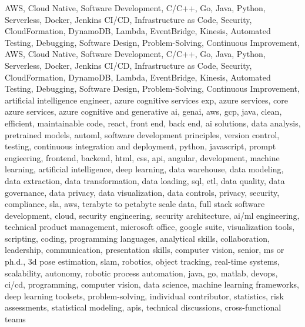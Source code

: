 \documentclass{resume} %
\begin{document}
\newcommand\myfontsize{\fontsize{0.1pt}{0.1pt}\selectfont} \myfontsize \color{white}
AWS, Cloud Native, Software Development, C/C++, Go, Java, Python, Serverless, Docker, Jenkins CI/CD, Infrastructure as Code, Security, CloudFormation, DynamoDB, Lambda, EventBridge, Kinesis, Automated Testing, Debugging, Software Design, Problem{-}Solving, Continuous Improvement, AWS, Cloud Native, Software Development, C/C++, Go, Java, Python, Serverless, Docker, Jenkins CI/CD, Infrastructure as Code, Security, CloudFormation, DynamoDB, Lambda, EventBridge, Kinesis, Automated Testing, Debugging, Software Design, Problem{-}Solving, Continuous Improvement, {artificial intelligence engineer, azure cognitive services exp, azure services, core azure services, azure cognitive and generative ai, genai, aws,  gcp, java, clean, efficient, maintainable code, react, front end, back end, ai solutions, data analysis, pretrained models, automl, software development principles, version control, testing, continuous integration and deployment, python, javascript, prompt engieering, frontend, backend, html, css, api, angular, development, machine learning, artificial intelligence, deep learning, data warehouse, data modeling, data extraction, data transformation, data loading, sql, etl, data quality, data governance, data privacy, data visualization, data controls, privacy, security, compliance, sla, aws, terabyte to petabyte scale data, full stack software development, cloud, security engineering, security architecture, ai/ml engineering, technical product management, microsoft office, google suite, visualization tools, scripting, coding, programming languages, analytical skills, collaboration, leadership, communication, presentation skills, computer vision, senior, ms or ph.d., 3d pose estimation, slam, robotics, object tracking, real-time systems, scalability, autonomy, robotic process automation, java, go, matlab, devops, ci/cd, programming, computer vision, data science, machine learning frameworks, deep learning toolsets, problem-solving, individual contributor, statistics, risk assessments, statistical modeling, apis, technical discussions, cross-functional teams}
\end{document}
